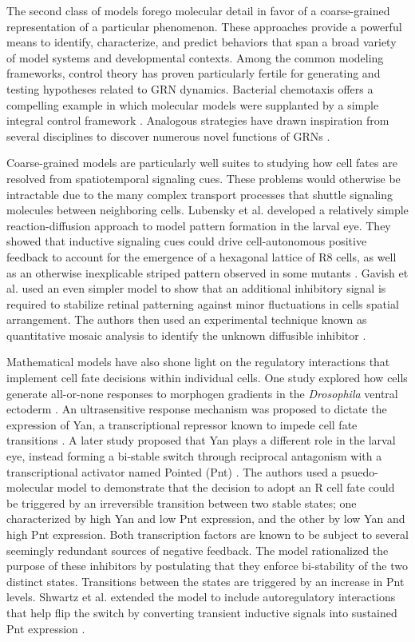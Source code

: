 The second class of models forego molecular detail in favor of a coarse-grained representation of a particular phenomenon. These approaches provide a powerful means to identify, characterize, and predict behaviors that span a broad variety of model systems and developmental contexts. Among the common modeling frameworks, control theory has proven particularly fertile for generating and testing hypotheses related to GRN dynamics. Bacterial chemotaxis offers a compelling example in which molecular models were supplanted by a simple integral control framework \cite{Barkai1997b,Alon1999,Yi2000,Muzzey2009}. Analogous strategies have drawn inspiration from several disciplines to discover numerous novel functions of GRNs \cite{Ma2009,Colman-Lerner2005,Rahimi2016,Benzinger2018,Adler2018,Yordanov2018}.

Coarse-grained models are particularly well suites to studying how cell fates are resolved from spatiotemporal signaling cues. These problems would otherwise be intractable due to the many complex transport processes that shuttle signaling molecules between neighboring cells. Lubensky et al. developed a relatively simple reaction-diffusion approach to model pattern formation in the larval eye. They showed that inductive signaling cues could drive cell-autonomous positive feedback to account for the emergence of a hexagonal lattice of R8 cells, as well as an otherwise inexplicable striped pattern observed in some mutants \cite{Lubensky2011}. Gavish et al. used an even simpler model to show that an additional inhibitory signal is required to stabilize retinal patterning against minor fluctuations in cells spatial arrangement. The authors then used an experimental technique known as quantitative mosaic analysis to identify the unknown diffusible inhibitor \cite{Gavish2016}.

Mathematical models have also shone light on the regulatory interactions that implement cell fate decisions within individual cells. One study explored how cells generate all-or-none responses to morphogen gradients in the \emph{Drosophila} ventral ectoderm \cite{Melen2005}. An ultrasensitive response mechanism was proposed to dictate the expression of Yan, a transcriptional repressor known to impede cell fate transitions \cite{Lai1992a,Rogge1995,Rebay1995}. A later study proposed that Yan plays a different role in the larval eye, instead forming a bi-stable switch through reciprocal antagonism with a transcriptional activator named Pointed (Pnt) \cite{Graham2010}. The authors used a psuedo-molecular model to demonstrate that the decision to adopt an R cell fate could be triggered by an irreversible transition between two stable states; one characterized by high Yan and low Pnt expression, and the other by low Yan and high Pnt expression. Both transcription factors are known to be subject to several seemingly redundant sources of negative feedback. The model rationalized the purpose of these inhibitors by postulating that they enforce bi-stability of the two distinct states. Transitions between the states are triggered by an increase in Pnt levels. Shwartz et al. extended the model to include autoregulatory interactions that help flip the switch by converting transient inductive signals into sustained Pnt expression \cite{Shwartz2013}.

